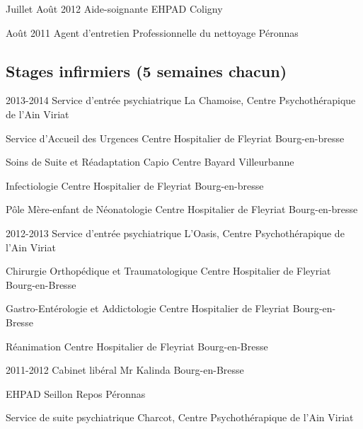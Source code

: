 \documentclass[10pt,a4paper,sans]{moderncv}
\begin{document}
\cventry
    {Juillet Août 2012}
	{Aide-soignante}
	{EHPAD}
	{Coligny}
	{}
	{}

\cventry
	{Août 2011}
	{Agent d'entretien}
	{Professionnelle du nettoyage}
	{Péronnas}
	{}
	{}

\vspace*{3mm}

\subsection{Stages infirmiers (5 semaines chacun)}
	
\cventry
	{2013-2014}
	{Service d'entrée psychiatrique}
	{La Chamoise, Centre Psychothérapique de l’Ain}
	{Viriat}
	{}
	{}

\cventry
	{}
	{Service d’Accueil des Urgences}
	{Centre Hospitalier de Fleyriat}
	{Bourg-en-bresse}
	{}
	{}

\cventry
	{}
	{Soins de Suite et Réadaptation}
	{Capio Centre Bayard}
	{Villeurbanne}
	{}
	{}

\cventry
	{}
	{Infectiologie}
	{Centre Hospitalier de Fleyriat}
	{Bourg-en-bresse}
	{}
	{}

\cventry
	{}
	{Pôle Mère-enfant de Néonatologie}
	{Centre Hospitalier de Fleyriat}
	{Bourg-en-bresse}
	{}
	{}

\vspace*{3mm}

\cventry
	{2012-2013}
	{Service d’entrée psychiatrique}
	{L'Oasis, Centre Psychothérapique de l’Ain}
	{Viriat}
	{}
	{}

\cventry
	{}
	{Chirurgie Orthopédique et Traumatologique}
	{Centre Hospitalier de Fleyriat}
	{Bourg-en-Bresse}
	{}
	{}

\cventry
	{}
	{Gastro-Entérologie et Addictologie}
    {Centre Hospitalier de Fleyriat}
	{Bourg-en-Bresse}
	{}
	{}

\cventry
	{}
	{Réanimation}
	{Centre Hospitalier de Fleyriat}
	{Bourg-en-Bresse}
	{}
	{}

\vspace*{3mm}

\cventry
	{2011-2012}
	{Cabinet libéral}
	{Mr Kalinda}
	{Bourg-en-Bresse}
	{}
	{}

\cventry
	{}
	{EHPAD}
	{Seillon Repos}
	{Péronnas}
	{}
	{}

\cventry
	{}
	{Service de suite psychiatrique}
	{Charcot, Centre Psychothérapique de l’Ain}
	{Viriat}
	{}
	{}


\end{document}
